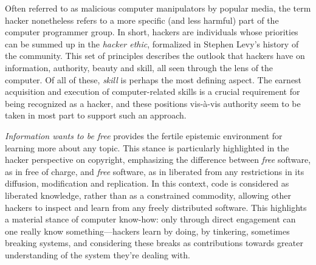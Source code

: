 \documentclass{article}
\begin{document}
Often referred to as malicious computer manipulators by popular media, the term hacker nonetheless refers to a more specific (and less harmful) part of the computer programmer group. In short, hackers are individuals whose priorities can be summed up in the \emph{hacker ethic}, formalized in Stephen Levy's history of the community\cite{levy_hackers_2010}. This set of principles describes the outlook that hackers have on information, authority, beauty and skill, all seen through the lens of the computer. Of all of these, \emph{skill} is perhaps the most defining aspect. The earnest acquisition and execution of computer-related skills is a crucial requirement for being recognized as a hacker, and these positions vis-à-vis authority seem to be taken in most part to support such an approach.

\emph{Information wants to be free} provides the fertile epistemic environment for learning more about any topic. This stance is particularly highlighted in the hacker perspective on copyright, emphasizing the difference between \emph{free} software, as in free of charge, and \emph{free} software, as in liberated from any restrictions in its diffusion, modification and replication. In this context, code is considered as liberated knowledge, rather than as a constrained commodity, allowing other hackers to inspect and learn from any freely distributed software. This highlights a material stance of computer know-how: only through direct engagement can one really know something—hackers learn by doing, by tinkering, sometimes breaking systems, and considering these breaks as contributions towards greater understanding of the system they're dealing with.
\end{document}
